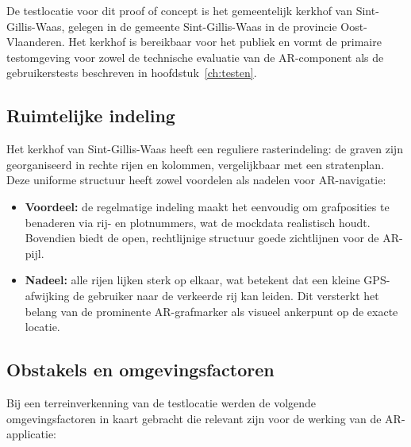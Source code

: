 De testlocatie voor dit proof of concept is het gemeentelijk kerkhof van Sint-Gillis-Waas, gelegen in de gemeente Sint-Gillis-Waas in de provincie Oost-Vlaanderen. Het kerkhof is bereikbaar voor het publiek en vormt de primaire testomgeving voor zowel de technische evaluatie van de AR-component als de gebruikerstests beschreven in hoofdstuk~\ref{ch:testen}.

\subsection{Ruimtelijke indeling}

Het kerkhof van Sint-Gillis-Waas heeft een reguliere rasterindeling: de graven zijn georganiseerd in rechte rijen en kolommen, vergelijkbaar met een stratenplan. Deze uniforme structuur heeft zowel voordelen als nadelen voor AR-navigatie:

\begin{itemize}
    \item \textbf{Voordeel:} de regelmatige indeling maakt het eenvoudig om grafposities te benaderen via rij- en plotnummers, wat de mockdata realistisch houdt. Bovendien biedt de open, rechtlijnige structuur goede zichtlijnen voor de AR-pijl.
    \item \textbf{Nadeel:} alle rijen lijken sterk op elkaar, wat betekent dat een kleine GPS-afwijking de gebruiker naar de verkeerde rij kan leiden. Dit versterkt het belang van de prominente AR-grafmarker als visueel ankerpunt op de exacte locatie.
\end{itemize}

\subsection{Obstakels en omgevingsfactoren}

Bij een terreinverkenning van de testlocatie werden de volgende omgevingsfactoren in kaart gebracht die relevant zijn voor de werking van de AR-applicatie:

